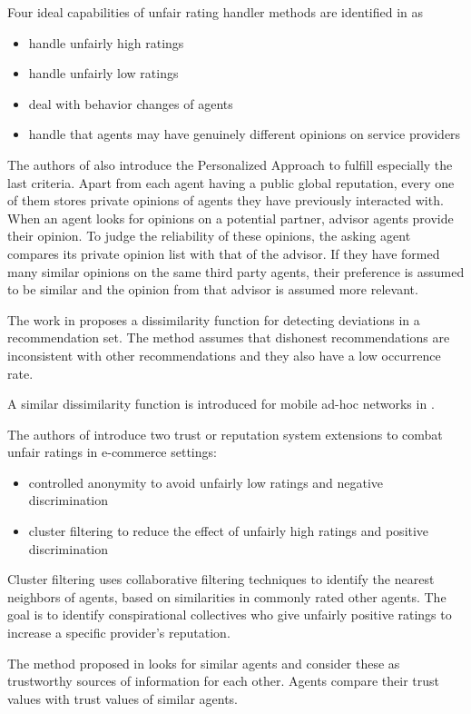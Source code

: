 \documentclass[%
    ]{\PathToTumTemplate/thesis/tum_thesis}
\begin{document}
Four ideal capabilities of unfair rating handler methods are identified in \cite{zhang_personalized_2006} as
\begin{itemize}
\item handle unfairly high ratings
\item handle unfairly low ratings
\item deal with behavior changes of agents
\item handle that agents may have genuinely different opinions on service providers
\end{itemize}
The authors of \cite{zhang_personalized_2006} also introduce the Personalized Approach to fulfill especially the last criteria.
Apart from each agent having a public global reputation, every one of them stores private opinions of agents they have previously interacted with.
When an agent looks for opinions on a potential partner, advisor agents provide their opinion.
To judge the reliability of these opinions, the asking agent compares its private opinion list with that of the advisor.
If they have formed many similar opinions on the same third party agents, their preference is assumed to be similar and the opinion from that advisor is assumed more relevant.

The work in \cite{iltaf_mechanism_2013} proposes a dissimilarity function for detecting deviations in a recommendation set.
The method assumes that dishonest recommendations are inconsistent with other recommendations and they also have a low occurrence rate.

A similar dissimilarity function is introduced for mobile ad-hoc networks in \cite{zakirullah_detection_2014}.

The authors of \cite{dellarocas_immunizing_2000} introduce two trust or reputation system extensions to combat unfair ratings in e-commerce settings:
\begin{itemize}
\item controlled anonymity to avoid unfairly low ratings and negative discrimination
\item cluster filtering to reduce the effect of unfairly high ratings and positive discrimination
\end{itemize}
Cluster filtering uses collaborative filtering techniques to identify the nearest neighbors of agents, based on similarities in commonly rated other agents.
The goal is to identify conspirational collectives who give unfairly positive ratings to increase a specific provider's reputation.

The method proposed in \cite{zupancic_qade_2015} looks for similar agents and consider these as trustworthy sources of information for each other.
Agents compare their trust values with trust values of similar agents.
\end{document}
